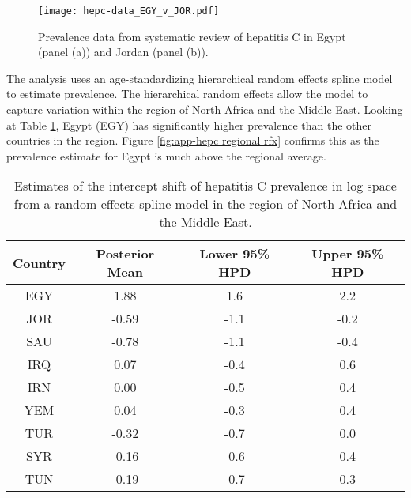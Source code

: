     \begin{figure}[h]
        \begin{center}
            \texttt{[image: hepc-data\_EGY\_v\_JOR.pdf]}
            \caption{Prevalence data from systematic review of
              hepatitis C in Egypt (panel (a)) and Jordan (panel
              (b)).}
            \label{fig:app-hepc data}
        \end{center}
    \end{figure}

The analysis uses an age-standardizing hierarchical random effects 
spline model to estimate prevalence.
The hierarchical random effects allow the model to capture variation
within the region of North Africa and the Middle East.  Looking at
Table \ref{tab:app-hepc regional rfx}, Egypt (EGY) has significantly
higher prevalence than the other countries in the region.  Figure
\ref{fig:app-hepc regional rfx} confirms this as the prevalence
estimate for Egypt is much above the regional average.

    \begin{table}[h]
        \begin{center}
        \caption{ Estimates of the intercept shift of hepatitis C prevalence in log space from a random effects spline model in the region of North Africa and the Middle East.}
        \label{tab:app-hepc regional rfx}
        \begin{tabular}{|c|c|c|c|}
            \hline
                Country & Posterior Mean & Lower 95\% HPD  & Upper 95\%  HPD \\
            \hline
                EGY	&	1.88	&	 1.6	&	2.2	\\
                JOR	&	-0.59	&	-1.1	&	-0.2 \\
                SAU	&	-0.78	&	-1.1	&	-0.4 \\
                IRQ	&	0.07	&	-0.4	&	0.6	\\
                IRN	&	0.00	&	-0.5	&	0.4	\\
                YEM	&	0.04	&	-0.3	&	0.4	\\
                TUR	&	-0.32	&	-0.7	&	0.0	\\
                SYR	&	-0.16	&	-0.6	&	0.4	\\
                TUN	&	-0.19	&	-0.7	&	0.3	\\
            \hline
        \end{tabular}
        \end{center}
    \end{table}

